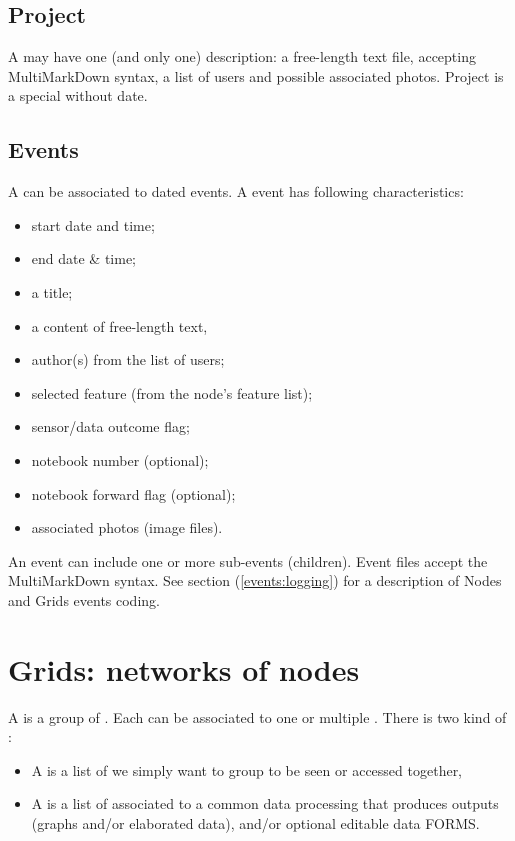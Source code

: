 \subsection{Project}
\label{projectnode}

A  may have one (and only one)  description: a free-length text file, accepting MultiMarkDown syntax, a list of users and possible associated photos. Project is a special  without date.

\subsection{Events}
\label{eventnode}

A  can be associated to dated events. A  event has following characteristics:
\begin{itemize}
	\item start date and time;
	\item end date \& time;
	\item a title;
	\item a content of free-length text,
	\item author(s) from the list of \webobs users;
	\item selected feature (from the node's feature list);
	\item sensor/data outcome flag;
	\item notebook number (optional);
	\item notebook forward flag (optional);
	\item associated photos (image files).
\end{itemize}
An event can include one or more sub-events (children). Event files  accept the MultiMarkDown syntax. See  section (\ref{events:logging}) for a description of Nodes and Grids events coding.


\section{Grids: networks of nodes}
\label{grids}

A  is a group of . Each  can be associated to one or multiple . There is two kind of :

\begin{itemize}
\item    A  is a list of  we simply want to group to be seen or accessed together,
\item    A  is a list of  associated to a common data processing that produces outputs (graphs and/or elaborated data), and/or optional editable data FORMS.
\end{itemize}

